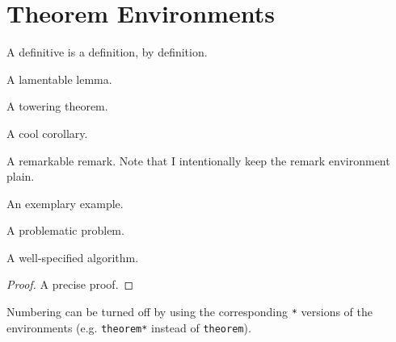 \documentclass[12pt]{article}
\begin{document}
\section{Theorem Environments}
\label{sec:thm-env}

\begin{definition}
  A definitive  is a definition, by definition. 
\end{definition}
\begin{lemma}
  A lamentable lemma. 
\end{lemma}
\begin{theorem}
  A towering theorem. 
\end{theorem}
\begin{corollary}
  A cool corollary. 
\end{corollary}
\begin{remark}
  A remarkable remark. 
  Note that I intentionally keep the remark environment plain.
\end{remark}
\begin{example}
  An exemplary example. 
\end{example}
\begin{problem}
  A problematic problem.
\end{problem}
\begin{algorithm}
  A well-specified algorithm.
\end{algorithm}
\begin{proof}
  A precise proof.
\end{proof}

\begin{proposition}
  \lipsum[1-4]
\end{proposition}

Numbering can be turned off by using the corresponding \verb|*| versions of the environments (e.g. \verb|theorem*| instead of \verb|theorem|). 
\end{document}
